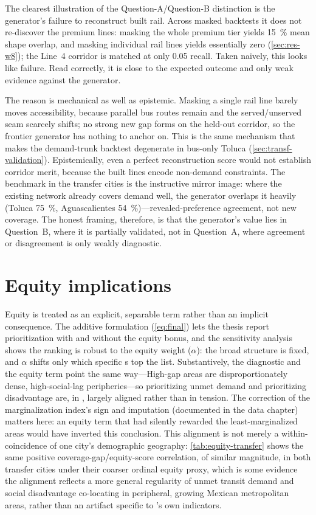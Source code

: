 The clearest illustration of the Question-A/Question-B distinction is the generator's
failure to reconstruct built rail. Across masked backtests it does not re-discover the
premium lines: masking the whole premium tier yields \SI{15}{\percent} mean shape
overlap, and masking individual rail lines yields essentially zero
(\cref{sec:res-w8}); the Line~4 corridor is matched at only \num{0.05} recall. Taken
naively, this looks like failure. Read correctly, it is close to the expected outcome
and only weak evidence against the generator.

The reason is mechanical as well as epistemic. Masking a single rail line barely moves
accessibility, because parallel bus routes remain and the served/unserved seam scarcely
shifts; no strong new gap forms on the held-out corridor, so the frontier generator has
nothing to anchor on. This is the same mechanism that makes the demand-trunk backtest
degenerate in bus-only Toluca (\cref{sec:transf-validation}). Epistemically, even a
perfect reconstruction score would not establish corridor merit, because the built
lines encode non-demand constraints. The benchmark in the transfer cities is the
instructive mirror image: where the existing network already covers demand well, the
generator overlaps it heavily (Toluca \SI{75}{\percent}, Aguascalientes
\SI{54}{\percent})---revealed-preference agreement, not new coverage. The honest
framing, therefore, is that the generator's value lies in Question~B, where it is
partially validated, not in Question~A, where agreement or disagreement is only weakly
diagnostic.

\section{Equity implications}
\label{sec:disc-equity}

Equity is treated as an explicit, separable term rather than an implicit consequence.
The additive formulation (\cref{eq:final}) lets the thesis report prioritization with
and without the equity bonus, and the sensitivity analysis shows the ranking is robust
to the equity weight ($\alpha$): the broad structure is fixed, and $\alpha$ shifts only
which specific \ageb{}s top the list. Substantively, the diagnostic and the equity term
point the same way---High-gap areas are disproportionately dense, high-social-lag
peripheries---so prioritizing unmet demand and prioritizing disadvantage are, in \zmg,
largely aligned rather than in tension. The correction of the marginalization index's
sign and imputation (documented in the data chapter) matters here: an equity term that
had silently rewarded the least-marginalized areas would have inverted this conclusion.
This alignment is not merely a within-\zmg coincidence of one city's demographic
geography: \cref{tab:equity-transfer} shows the same positive coverage-gap/equity-score
correlation, of similar magnitude, in both transfer cities under their coarser ordinal
equity proxy, which is some evidence the alignment reflects a more general regularity
of unmet transit demand and social disadvantage co-locating in peripheral, growing
Mexican metropolitan areas, rather than an artifact specific to \zmg's own indicators.


